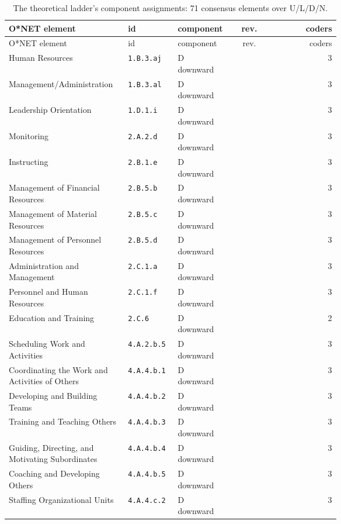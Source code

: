 \begingroup\small
\begin{longtable}[]{@{}p{0.36\linewidth}p{0.15\linewidth}p{0.15\linewidth}cr@{}}
\caption{The theoretical ladder's component assignments: 71 consensus elements over U/L/D/N.}\label{tab:elements-components}\\
\toprule\noalign{}
O*NET element & id & component & rev. & coders \\
\midrule\noalign{}
\endfirsthead
\toprule\noalign{}
O*NET element & id & component & rev. & coders \\
\midrule\noalign{}
\endhead
\bottomrule\noalign{}
\endlastfoot
Human Resources & \texttt{1.B.3.aj} & D downward & & 3 \\
Management/Administration & \texttt{1.B.3.al} & D downward & & 3 \\
Leadership Orientation & \texttt{1.D.1.i} & D downward & & 3 \\
Monitoring & \texttt{2.A.2.d} & D downward & & 3 \\
Instructing & \texttt{2.B.1.e} & D downward & & 3 \\
Management of Financial Resources & \texttt{2.B.5.b} & D downward & & 3 \\
Management of Material Resources & \texttt{2.B.5.c} & D downward & & 3 \\
Management of Personnel Resources & \texttt{2.B.5.d} & D downward & & 3 \\
Administration and Management & \texttt{2.C.1.a} & D downward & & 3 \\
Personnel and Human Resources & \texttt{2.C.1.f} & D downward & & 3 \\
Education and Training & \texttt{2.C.6} & D downward & & 2 \\
Scheduling Work and Activities & \texttt{4.A.2.b.5} & D downward & & 3 \\
Coordinating the Work and Activities of Others & \texttt{4.A.4.b.1} & D downward & & 3 \\
Developing and Building Teams & \texttt{4.A.4.b.2} & D downward & & 3 \\
Training and Teaching Others & \texttt{4.A.4.b.3} & D downward & & 3 \\
Guiding, Directing, and Motivating Subordinates & \texttt{4.A.4.b.4} & D downward & & 3 \\
Coaching and Developing Others & \texttt{4.A.4.b.5} & D downward & & 3 \\
Staffing Organizational Units & \texttt{4.A.4.c.2} & D downward & & 3 \\

\end{longtable}
